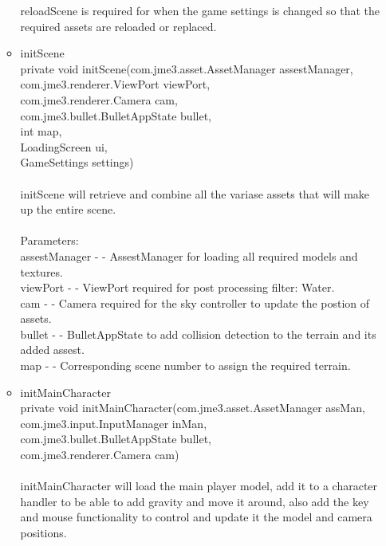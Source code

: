 \documentclass[letterpaper]{article}
\begin{document}
\begin{itemize}
\begin{itemize}
											reloadScene is required for when the game settings is changed so that the required assets are reloaded or replaced. \\
									\item	initScene \\
											private void initScene(com.jme3.asset.AssetManager assestManager, \\
		             com.jme3.renderer.ViewPort viewPort, \\
		             com.jme3.renderer.Camera cam, \\
		             com.jme3.bullet.BulletAppState bullet, \\
		             int map, \\
		             LoadingScreen ui, \\
		             GameSettings settings) \\ \\
											initScene will retrieve and combine all the variase assets that will make up the entire scene. \\ \\
											Parameters: \\
											assestManager - - AssestManager for loading all required models and textures. \\
											viewPort - - ViewPort required for post processing filter: Water. \\
											cam - - Camera required for the sky controller to update the postion of assets. \\
											bullet - - BulletAppState to add collision detection to the terrain and its added assest. \\
											map - - Corresponding scene number to assign the required terrain. \\
									\item	initMainCharacter \\
											private void initMainCharacter(com.jme3.asset.AssetManager assMan, \\
		                     com.jme3.input.InputManager inMan, \\
		                     com.jme3.bullet.BulletAppState bullet, \\
		                     com.jme3.renderer.Camera cam) \\ \\
											initMainCharacter will load the main player model, add it to a character handler to be able to add gravity and move it around, also add the key and mouse functionality to control and update it the model and camera positions. \\ \\

\end{itemize}
\end{itemize}
\end{document}
